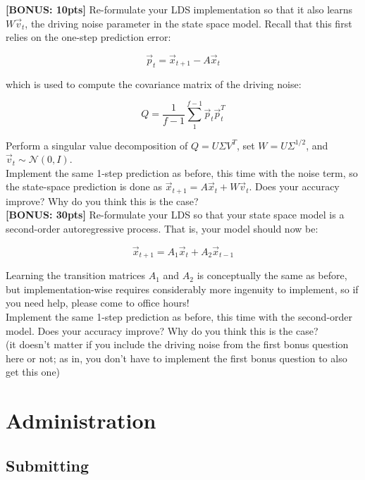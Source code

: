 \documentclass[paper=a4, fontsize=11pt]{scrartcl} %
\numberwithin{figure}{section} %
\numberwithin{table}{section} %
\begin{document}
\textbf{[BONUS: 10pts]} Re-formulate your LDS implementation so that it also learns $W\vec{v}_t$, the driving noise parameter in the state space model. Recall that this first relies on the one-step prediction error:

$$
\vec{p}_t = \vec{x}_{t + 1} - A\vec{x}_t
$$

which is used to compute the covariance matrix of the driving noise:

$$
Q = \frac{1}{f - 1} \sum_1^{f - 1} \vec{p}_t \vec{p}_t^T
$$

Perform a singular value decomposition of $Q = U \Sigma V^T$, set $W = U \Sigma^{1/2}$, and $\vec{v}_t \sim \mathcal{N}(0, I)$. \\

Implement the same 1-step prediction as before, this time with the noise term, so the state-space prediction is done as $\vec{x}_{t + 1} = A\vec{x}_t + W\vec{v}_t$. Does your accuracy improve? Why do you think this is the case? \\

\textbf{[BONUS: 30pts]} Re-formulate your LDS so that your state space model is a second-order autoregressive process. That is, your model should now be:

$$
\vec{x}_{t + 1} = A_1\vec{x}_t + A_2\vec{x}_{t - 1}
$$

Learning the transition matrices $A_1$ and $A_2$ is conceptually the same as before, but implementation-wise requires considerably more ingenuity to implement, so if you need help, please come to office hours! \\

Implement the same 1-step prediction as before, this time with the second-order model. Does your accuracy improve? Why do you think this is the case? \\

(it doesn't matter if you include the driving noise from the first bonus question here or not; as in, you don't have to implement the first bonus question to also get this one)

\section*{Administration}
\setcounter{subsection}{0}

\subsection{Submitting}
\end{document}
